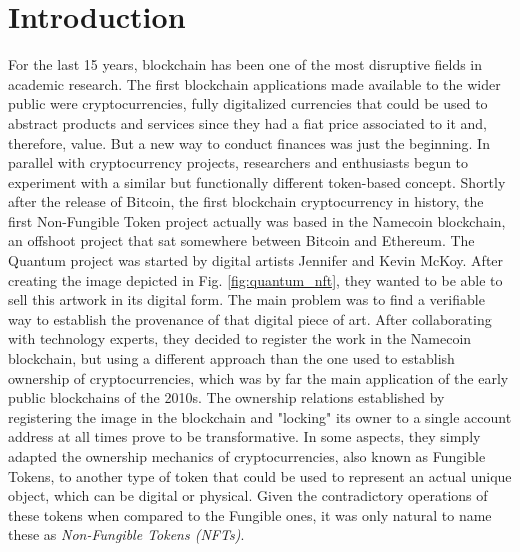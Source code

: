 \documentclass[../main.tex]{subfiles}
\begin{document}
\section{Introduction}
\label{sec:introduction}

For the last 15 years, blockchain has been one of the most disruptive fields in academic research. The first blockchain applications made available to the wider public were cryptocurrencies, fully digitalized currencies that could be used to abstract products and services since they had a fiat price associated to it and, therefore, value. But a new way to conduct finances was just the beginning. In parallel with cryptocurrency projects, researchers and enthusiasts begun to experiment with a similar but functionally different token-based concept. Shortly after the release of Bitcoin, the first blockchain cryptocurrency in history, the first Non-Fungible Token project actually was based in the Namecoin blockchain, an offshoot project that sat somewhere between Bitcoin and Ethereum. The Quantum project \cite{Exmundo2023} was started by digital artists Jennifer and Kevin McKoy. After creating the image depicted in Fig. \ref{fig:quantum_nft}, they wanted to be able to sell this artwork in its digital form. The main problem was to find a verifiable way to establish the provenance of that digital piece of art. After collaborating with technology experts, they decided to register the work in the Namecoin blockchain, but using a different approach than the one used to establish ownership of cryptocurrencies, which was by far the main application of the early public blockchains of the 2010s. The ownership relations established by registering the image in the blockchain and "locking" its owner to a single account address at all times prove to be transformative. In some aspects, they simply adapted the ownership mechanics of cryptocurrencies, also known as Fungible Tokens, to another type of token that could be used to represent an actual unique object, which can be digital or physical. Given the contradictory operations of these tokens when compared to the Fungible ones, it was only natural to name these as \textit{Non-Fungible Tokens (NFTs)}.
\par
\end{document}
